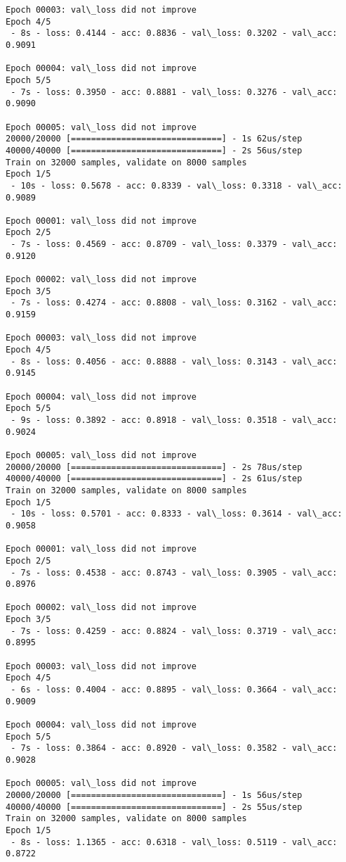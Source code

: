 \documentclass[11pt]{article}
\begin{document}
\begin{Verbatim}[commandchars=\\\{\}]
Epoch 00003: val\_loss did not improve
Epoch 4/5
 - 8s - loss: 0.4144 - acc: 0.8836 - val\_loss: 0.3202 - val\_acc: 0.9091

Epoch 00004: val\_loss did not improve
Epoch 5/5
 - 7s - loss: 0.3950 - acc: 0.8881 - val\_loss: 0.3276 - val\_acc: 0.9090

Epoch 00005: val\_loss did not improve
20000/20000 [==============================] - 1s 62us/step
40000/40000 [==============================] - 2s 56us/step
Train on 32000 samples, validate on 8000 samples
Epoch 1/5
 - 10s - loss: 0.5678 - acc: 0.8339 - val\_loss: 0.3318 - val\_acc: 0.9089

Epoch 00001: val\_loss did not improve
Epoch 2/5
 - 7s - loss: 0.4569 - acc: 0.8709 - val\_loss: 0.3379 - val\_acc: 0.9120

Epoch 00002: val\_loss did not improve
Epoch 3/5
 - 7s - loss: 0.4274 - acc: 0.8808 - val\_loss: 0.3162 - val\_acc: 0.9159

Epoch 00003: val\_loss did not improve
Epoch 4/5
 - 8s - loss: 0.4056 - acc: 0.8888 - val\_loss: 0.3143 - val\_acc: 0.9145

Epoch 00004: val\_loss did not improve
Epoch 5/5
 - 9s - loss: 0.3892 - acc: 0.8918 - val\_loss: 0.3518 - val\_acc: 0.9024

Epoch 00005: val\_loss did not improve
20000/20000 [==============================] - 2s 78us/step
40000/40000 [==============================] - 2s 61us/step
Train on 32000 samples, validate on 8000 samples
Epoch 1/5
 - 10s - loss: 0.5701 - acc: 0.8333 - val\_loss: 0.3614 - val\_acc: 0.9058

Epoch 00001: val\_loss did not improve
Epoch 2/5
 - 7s - loss: 0.4538 - acc: 0.8743 - val\_loss: 0.3905 - val\_acc: 0.8976

Epoch 00002: val\_loss did not improve
Epoch 3/5
 - 7s - loss: 0.4259 - acc: 0.8824 - val\_loss: 0.3719 - val\_acc: 0.8995

Epoch 00003: val\_loss did not improve
Epoch 4/5
 - 6s - loss: 0.4004 - acc: 0.8895 - val\_loss: 0.3664 - val\_acc: 0.9009

Epoch 00004: val\_loss did not improve
Epoch 5/5
 - 7s - loss: 0.3864 - acc: 0.8920 - val\_loss: 0.3582 - val\_acc: 0.9028

Epoch 00005: val\_loss did not improve
20000/20000 [==============================] - 1s 56us/step
40000/40000 [==============================] - 2s 55us/step
Train on 32000 samples, validate on 8000 samples
Epoch 1/5
 - 8s - loss: 1.1365 - acc: 0.6318 - val\_loss: 0.5119 - val\_acc: 0.8722


\end{Verbatim}
\end{document}
